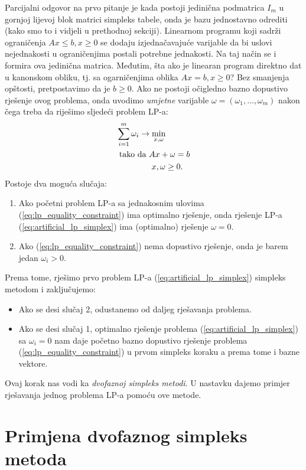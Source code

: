\documentclass[a4paper, utf8, 11pt, colorlinks]{book}
\begin{document}
 Parcijalni odgovor na prvo pitanje je kada postoji jedinična podmatrica $I_m$ u gornjoj lijevoj blok matrici simpleks tabele,  onda je bazu jednostavno odrediti (kako smo to i vidjeli u prethodnoj sekciji). 
 Linearnom programu koji sadrži ograničenja $Ax \leq b, x\geq 0$ se dodaju izjednačavajuće varijable da bi uslovi nejednakosti u ograničenjima postali potrebne jednakosti. Na taj način se i formira ova jedinična matrica. Međutim, šta ako je linearan program direktno dat u kanonskom obliku, tj. sa ogarničenjima oblika $Ax = b, x \geq 0$? Bez smanjenja opštosti, pretpostavimo da je $b \geq 0$. Ako ne postoji očigledno bazno dopustivo rješenje ovog problema, onda uvodimo \emph{umjetne} varijable $\omega = (\omega_1,\ldots, \omega_m)$ nakon čega treba da riješimo sljedeći problem LP-a:
 \begin{align}
      &\sum_{i=1}^m \omega_i \rightarrow \min_{x,\omega} \nonumber \\
      &\mbox{ tako da } A x + \omega = b \nonumber \\
      & \hspace{1.5cm} x, \omega \geq 0. \label{eq:artificial_lp_simplex}
 \end{align}
Postoje dva moguća slučaja:
\begin{enumerate}
    \item Ako početni problem LP-a sa jednakosnim ulovima (\ref{eq:lp_equality_constraint}) 
          ima optimalno rješenje, onda   rješenje LP-a (\ref{eq:artificial_lp_simplex}) ima (optimalno) rješenje $\omega = 0$. 
    \item Ako  (\ref{eq:lp_equality_constraint}) nema dopustivo rješenje, onda je barem jedan $\omega_i > 0$.
\end{enumerate}
 Prema tome, rješimo prvo problem LP-a  (\ref{eq:artificial_lp_simplex}) simpleks metodom i zaključujemo:
 \begin{itemize}
      \item Ako se desi slučaj 2, odustanemo od daljeg rješavanja problema.
      \item Ako se desi slučaj 1, optimalno rješenje problema (\ref{eq:artificial_lp_simplex}) sa $\omega_i=0$ nam daje početno bazno dopustivo rješenje problema (\ref{eq:lp_equality_constraint}) u prvom simpleks koraku a prema tome i bazne vektore. 
 \end{itemize} 
 Ovaj korak nas vodi ka \emph{dvofaznoj simpleks metodi}. U nastavku dajemo primjer rješavanja jednog problema LP-a pomoću ove metode.      
      
 \section{Primjena dvofaznog simpleks metoda}     
 
\end{document}
